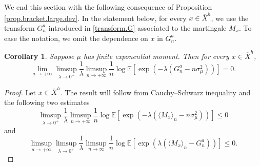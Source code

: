 \documentclass[JEP,XML,SOM,Unicode,published]{cedram}
\theoremstyle{plain}
\newtheorem{corollary}[theorem]{Corollary}
\theoremstyle{definition}
\newcommand\E{\mathbb{E}}
\begin{document}
We end this section with the following consequence of Proposition \ref{prop.bracket.large.dev}.
In the statement below, for every $x\in \overline{X}^h$, we use the transform $G_n^a$ introduced in \eqref{transform.G} associated to the martingale $M_x$. To ease the notation, we omit the dependence on $x$ in $G_n^a$.

\begin{corollary}\label{corollary.laplace.bracket}
Suppose $\mu$ has finite exponential moment. Then for every $x\in \overline{X}^h$,
\[
\lim_{a\to +\infty}\limsup_{\lambda\to 0^+}\frac{1}{\lambda} \limsup_{n\to +\infty}\frac{1}{n}\log {\E[\exp(-\lambda (G_n^a - n \sigma_{\mu}^2))]}= 0.
\]
\end{corollary}

\begin{proof}
Let $x\in \overline{X}^h$. The result will follow from Cauchy--Schwarz inequality and the following two estimates
\begin{equation}\label{1bis}
\limsup_{\lambda\to 0^+}\frac{1}{\lambda} \limsup_{n\to +\infty}\frac{1}{n}\log {\E[\exp(-\lambda (\langle M_x\rangle_n-n\sigma_{\mu}^2))]}\leq 0
\end{equation}
and
\begin{equation}\label{backtoidd2}
\limsup_{a\to +\infty} \limsup_{\lambda \to 0^+}\frac{1}{\lambda} \limsup_{n\to \infty} \frac{1}{n} \log \E[\exp(\lambda (\langle M_x \rangle_n - G_n^a))]\leq 0.
\end{equation}


\end{proof}
\end{document}
